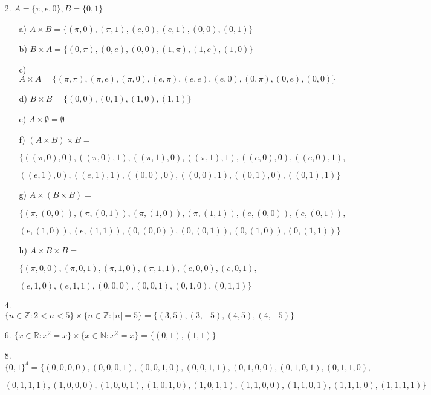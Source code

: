 \documentclass{article}
\begin{document}
\begin{enumerate}
    \item [2.] $A=\{\pi, e, 0\}, B=\{0,1\}$
    \begin{enumerate}
        \item[a)] $ A \times B = \{(\pi, 0),(\pi, 1),(e, 0),(e, 1),(0, 0),(0, 1)\}$
        \item[b)] $ B \times A = \{(0, \pi),(0, e),(0, 0),(1, \pi),(1, e),(1, 0)\}$
        \item[c)] $ A \times A = \{(\pi, \pi),(\pi, e),(\pi, 0),(e, \pi),(e, e),(e, 0),(0, \pi),(0, e),(0, 0)\}$
        \item[d)] $ B \times B = \{(0, 0),(0, 1),(1, 0),(1, 1)\}$
        \item[e)] $ A \times \emptyset = \emptyset$
        \item[f)] $ (A \times B) \times B = $
        \item[] $ \{((\pi, 0), 0),((\pi, 0), 1),((\pi, 1), 0),((\pi, 1), 1),((e, 0), 0),((e, 0), 1),$
        \item[] $ ((e, 1), 0),((e, 1), 1),((0, 0), 0),((0, 0), 1),((0, 1), 0),((0, 1), 1)\} $
        \item[g)] $ A \times (B \times B) = $
        \item[] $ \{(\pi, (0, 0)),(\pi, (0, 1)),(\pi, (1, 0)),(\pi, (1, 1)),(e, (0, 0)),(e, (0, 1)),$
        \item[] $ (e, (1, 0)),(e, (1, 1)),(0, (0, 0)),(0, (0, 1)),(0, (1, 0)),(0, (1, 1))\}$
        \item[h)] $ A \times B \times B = $
        \item[] $ \{(\pi, 0, 0),(\pi, 0, 1),(\pi, 1, 0),(\pi, 1, 1),(e, 0, 0),(e, 0, 1),$
        \item[] $ (e, 1, 0),(e, 1, 1),(0, 0, 0),(0, 0, 1),(0, 1, 0),(0, 1, 1)\}$
    \end{enumerate}
    \item [4.] $\{n \in \mathbb{Z}: 2<n<5\} \times \{n \in \mathbb{Z}:|n|=5\}=\{(3, 5),(3, -5),(4, 5),(4, -5)\}$
    \item [6.] $\{x \in \mathbb{R}: x^2=x\} \times \{x \in \mathbb{N}:x^2=x\}=\{(0, 1),(1, 1)\}$
    \item [8.] $\{0,1\}^4=\{(0, 0, 0, 0),(0, 0, 0, 1),(0, 0, 1, 0),(0, 0, 1, 1),(0, 1, 0, 0),(0, 1, 0, 1),(0, 1, 1, 0),$
    \item [] $ (0, 1, 1, 1),(1, 0, 0, 0),(1, 0, 0, 1),(1, 0, 1, 0),(1, 0, 1, 1),(1, 1, 0, 0),(1, 1, 0, 1),(1, 1, 1, 0),(1, 1, 1, 1)\}$
\end{enumerate}
\end{document}
